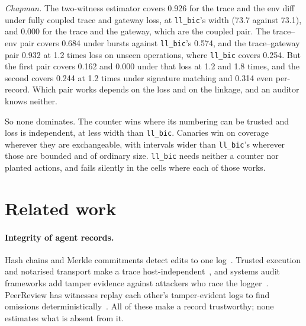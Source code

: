\documentclass[11pt]{article}
\begin{document}
\emph{Chapman.} The two-witness estimator covers 0.926 for the trace and the env
diff under fully coupled trace and gateway loss, at \texttt{ll\_bic}'s width (73.7
against 73.1), and 0.000 for the trace and the gateway, which are the coupled pair.
The trace--env pair covers 0.684 under bursts against \texttt{ll\_bic}'s 0.574, and
the trace--gateway pair 0.932 at 1.2 times loss on unseen operations, where
\texttt{ll\_bic} covers 0.254. But the first pair covers 0.162 and 0.000 under that
loss at 1.2 and 1.8 times, and the second covers 0.244 at 1.2 times under signature
matching and 0.314 even per-record. Which pair works depends on the loss and on the
linkage, and an auditor knows neither.

So none dominates. The counter wins where its numbering can be trusted and loss is
independent, at less width than \texttt{ll\_bic}. Canaries win on coverage wherever
they are exchangeable, with intervals wider than \texttt{ll\_bic}'s wherever those
are bounded and of ordinary size. \texttt{ll\_bic} needs neither a counter nor
planted actions, and fails silently in the cells where each of those works.

\begin{table}[h]
\centering

\caption{Cheaper checks against \texttt{ll\_bic}.}
\label{tab:cheap}
\end{table}

\begin{table}[h]
\centering

\caption{Canaries: how many, and where they sit.}
\label{tab:canary}
\end{table}

\section{Related work}
\label{sec:related}

\paragraph{Integrity of agent records.} Hash chains and Merkle commitments detect
edits to one log~\citep{flightrecorder2026}. Trusted execution and notarised
transport make a trace host-independent~\citep{vet2025}, and systems audit frameworks
add tamper evidence against attackers who race the logger~\citep{paccagnella2020kenny,paccagnella2020custos}.
PeerReview has witnesses replay each other's tamper-evident logs to find omissions
deterministically~\citep{haeberlen2007peerreview}. All of these make a record
trustworthy; none estimates what is absent from it.
\end{document}
